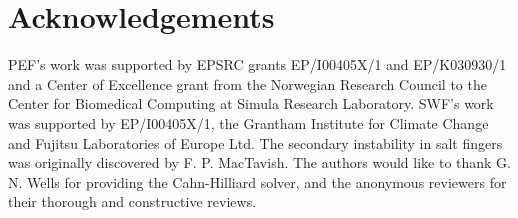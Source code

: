 \documentclass{siamltex}
\begin{document}
\section*{Acknowledgements}
PEF's work was supported by EPSRC grants EP/I00405X/1 and EP/K030930/1 and a Center of Excellence grant from the
Norwegian Research Council to the Center for Biomedical Computing at Simula Research Laboratory.
SWF's work was supported by EP/I00405X/1, the Grantham Institute for Climate Change and Fujitsu Laboratories of Europe Ltd.
The secondary instability in salt fingers was originally discovered by F. P. MacTavish.  The authors
would like to thank G. N. Wells for providing the Cahn-Hilliard solver, and the anonymous reviewers for
their thorough and constructive reviews. 



\end{document}
